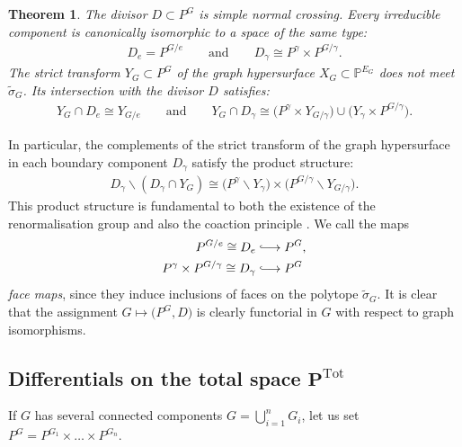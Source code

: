 \documentclass[pdftex]{sigma}%
\newtheorem{thm}{Theorem}[section]
\numberwithin{equation}{section}
\newcommand*{\Longhookrightarrow}{\ensuremath{\lhook\joinrel\relbar\joinrel\rightarrow}}
\newcommand{\Pro}{\mathbb P}
\newcommand{\0}{\color{blue}{\mathsf{0}}}
\begin{document}
\begin{thm} \label{thm: NormalCrossing} The divisor $D\subset P^G$ is simple normal crossing. Every irreducible component is canonically isomorphic to a space of the same type:
\begin{gather*}
D_e = P^{G/ e} \qquad \text{and} \qquad D_{\gamma} \cong P^{\gamma} \times P^{G/\gamma} .
\end{gather*}
The strict transform $Y_G \subset P^G$ of the graph hypersurface $X_G \subset \Pro^{E_G}$ does not meet $\widetilde{\sigma}_G$. Its intersection with the divisor $D$ satisfies:
\begin{gather*}
Y_G \cap D_e \cong Y_{G/e} \qquad \text{and} \qquad
Y_G \cap D_{\gamma} \cong \big(P^{\gamma} \times Y_{G/\gamma}\big) \cup \big(Y_{\gamma} \times P^{G/\gamma}\big) .
\end{gather*}
\end{thm}
In particular, the complements of the strict transform of the graph hypersurface in each boundary component $D_{\gamma}$ satisfy the product structure:
\begin{gather} \label{Dgammaproduct}
D_{\gamma} \backslash (D_{\gamma} \cap Y_{G}) \cong \big( P^{\gamma} \backslash Y_{\gamma} \big) \times \big(P^{G/\gamma} \backslash Y_{G/\gamma} \big) .
\end{gather}
This product structure is fundamental to both the existence of the renormalisation group \cite{BrownKreimer} and also the coaction principle \cite{Cosmic}. We call the maps
\begin{align*}
P^{G/e} \cong D_e & \Longhookrightarrow P^{G},
\\
P^{\gamma} \times P^{G/\gamma} \cong D_{\gamma} &\Longhookrightarrow P^{G}
\end{align*}
\emph{face maps}, since they induce inclusions of faces on the polytope $\widetilde{\sigma}_G$.
It is clear that the assignment $G\mapsto \big(P^G, D\big)$ is clearly functorial in $G$ with respect to graph isomorphisms.

\subsection[Differentials on the total space P Tot]
{Differentials on the total space $\boldsymbol{P^{\mathrm{Tot}}}$}
If $G$ has several connected components $G= \bigcup_{i=1}^n G_i$, let us set $P^G = P^{G_1} \times \dots \times P^{G_n}$.
\end{document}
